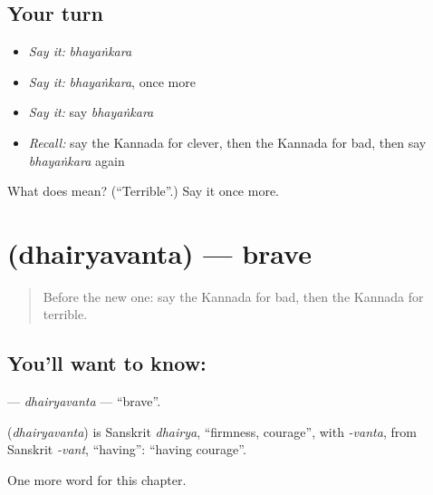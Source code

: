 \subsection*{Your turn}
\begin{itemize}
\raggedright
  \item \emph{Say it:} \emph{bhayaṅkara}
  \item \emph{Say it:} \emph{bhayaṅkara}, once more
  \item \emph{Say it:} say \emph{bhayaṅkara}
  \item \emph{Recall:} say the Kannada for clever, then the Kannada for bad, then say \emph{bhayaṅkara} again
\end{itemize}

\begin{tcolorbox}[breakable,colback=teal!4,colframe=teal!35!black,title={Before you move on}]
What does  mean? (\textquotedblleft{}Terrible\textquotedblright{}.) Say it once more.
\end{tcolorbox}
\section[\texorpdfstring{\kn{ಧೈರ್ಯವಂತ} (dhairyavanta)}{ಧೈರ್ಯವಂತ (dhairyavanta)}]{ (dhairyavanta) — brave}

\label{lesson:KA-C146-dhairyavanta}



\begin{quote}
Before the new one: say the Kannada for bad, then the Kannada for terrible.
\end{quote}

\subsection*{You'll want to know: }
\textbf{} — \emph{dhairyavanta} — \textquotedblleft{}brave\textquotedblright{}.

\begin{cousinweb}
\textbf{} (\emph{dhairyavanta}) is Sanskrit \emph{dhairya}, \textquotedblleft{}firmness, courage\textquotedblright{}, with \emph{-vanta}, from Sanskrit \emph{-vant}, \textquotedblleft{}having\textquotedblright{}: \textquotedblleft{}having courage\textquotedblright{}.
\end{cousinweb}

\begin{grammarlens}[title={What you've built}]
One more word for this chapter.
\end{grammarlens}

